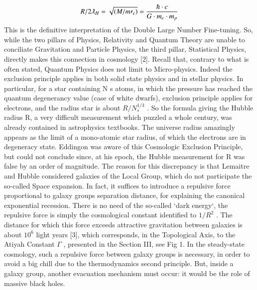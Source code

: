 \documentclass[twoside,draft]{article}
\begin{document}
\begin{sloppypar}
{$$R/2\lambdabar_{H} = \sqrt{(M/m\prime_{e})} = \frac{\hbar \cdot c}{G \cdot m_{e}\cdot m_{p}}$$
This is the definitive interpretation of the Double Large Number Fine-tuning. So, while the two
pillars of Physics, Relativity and Quantum Theory are unable to conciliate Gravitation and Particle
Physics, the third pillar, Statistical Physics, directly makes this connection in cosmology [2].
Recall that, contrary to what is often stated, Quantum Physics does not limit to Micro-physics.
Indeed the exclusion principle applies in both solid state physics and in stellar physics. In particular,
for a star containing N s atoms, in which the pressure has reached the quantum degenerancy value
(case of white dwarfs), exclusion principle applies for electrons, and the radius star is about $R/N_{s}^{1/3}$ .
So the formula giving the Hubble radius R, a very difficult measurement which puzzled a whole
century, was already contained in astrophysics textbooks. The universe radius amazingly appears as
the limit of a mono-atomic star radius, of which the electrons are in degeneracy state. Eddingon was
aware of this Cosmologic Exclusion Principle, but could not conclude since, at his epoch, the
Hubble measurement for R was false by an order of magnitude.
The reason for this discrepancy is that Lemaitre and Hubble considered galaxies of the Local
Group, which do not participate the so-called Space expansion. In fact, it suffices to introduce a
repulsive force proportional to galaxy groups separation distance, for explaining the canonical
exponential recession. There is no need of the so-called `dark energy`, the repulsive force is simply
the cosmological constant identified to $1/R^{2}$ . The distance for which this force exceeds attractive
gravitation between galaxies is about $10^{6}$ light years \cite{fm1}[3], which corresponds, in the Topological
Axis, to the Atiyah Constant $\Gamma$ , presented in the Section III, see Fig 1.
In the steady-state cosmology, such a repulsive force between galaxy groups is necessary, in
order to avoid a big chill due to the thermodynamics second principle. But, inside a galaxy group,
another evacuation mechanism must occur: it would be the role of massive black holes.

}
\end{sloppypar}
\end{document}
